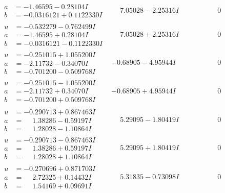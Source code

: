 \documentclass[1p]{elsarticle_modified}
\theoremstyle{definition}
\begin{document}
$$\begin{array}{c|c|c}
\begin{aligned}
a &= -1.46595 - 0.28104 I \\
b &= -0.0316121 + 0.1122330 I\end{aligned}
 & \phantom{-}7.05028 - 2.25316 I & \phantom{-0.000000 } 0 \\ \hline\begin{aligned}
u &= -0.532279 - 0.762499 I \\
a &= -1.46595 + 0.28104 I \\
b &= -0.0316121 - 0.1122330 I\end{aligned}
 & \phantom{-}7.05028 + 2.25316 I & \phantom{-0.000000 } 0 \\ \hline\begin{aligned}
u &= -0.251015 + 1.055200 I \\
a &= -2.11732 - 0.34070 I \\
b &= -0.701200 - 0.509768 I\end{aligned}
 & -0.68905 - 4.95944 I & \phantom{-0.000000 } 0 \\ \hline\begin{aligned}
u &= -0.251015 - 1.055200 I \\
a &= -2.11732 + 0.34070 I \\
b &= -0.701200 + 0.509768 I\end{aligned}
 & -0.68905 + 4.95944 I & \phantom{-0.000000 } 0 \\ \hline\begin{aligned}
u &= -0.290713 + 0.867463 I \\
a &= \phantom{-}1.38286 - 0.59197 I \\
b &= \phantom{-}1.28028 - 1.10864 I\end{aligned}
 & \phantom{-}5.29095 - 1.80419 I & \phantom{-0.000000 } 0 \\ \hline\begin{aligned}
u &= -0.290713 - 0.867463 I \\
a &= \phantom{-}1.38286 + 0.59197 I \\
b &= \phantom{-}1.28028 + 1.10864 I\end{aligned}
 & \phantom{-}5.29095 + 1.80419 I & \phantom{-0.000000 } 0 \\ \hline\begin{aligned}
u &= -0.270696 + 0.871703 I \\
a &= \phantom{-}2.72325 + 0.14432 I \\
b &= \phantom{-}1.54169 + 0.09691 I\end{aligned}
 & \phantom{-}5.31835 - 0.73098 I & \phantom{-0.000000 } 0 \\ \hline\begin{aligned}

\end{aligned}
\end{array}$$
\end{document}
